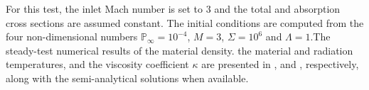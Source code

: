 \documentclass[times]{fldauth}
\begin{document}
%
For this test, the inlet Mach number is set to $3$ and the total and absorption cross sections are assumed constant. The initial conditions are computed from the four non-dimensional numbers $\mathbb{P}_\infty=10^{-4}$, $M=3$, $\mathbb{\Sigma}=10^6$ and $\mathbb{\Lambda}=1$.The steady-test numerical results of the material density. the material and radiation temperatures, and the viscosity coefficient $\kappa$ are presented in ,  and , respectively, along with the semi-analytical solutions when available.
\end{document}
